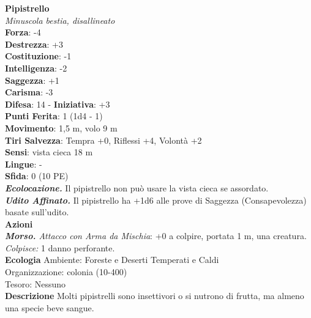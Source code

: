\begin{multicols}{2}
\medskip\textbf{Pipistrello}\\
\emph{Minuscola bestia, disallineato}\\
\textbf{Forza}: -4\\
\textbf{Destrezza}: +3\\
\textbf{Costituzione}: -1\\
\textbf{Intelligenza}: -2\\
\textbf{Saggezza}: +1\\
\textbf{Carisma}: -3\\
\textbf{Difesa}: 14 - \textbf{Iniziativa}: +3\\
\textbf{Punti Ferita}: 1 (1d4 - 1)\\
\textbf{Movimento}: 1,5 m, volo 9 m\\
\textbf{Tiri Salvezza}: Tempra +0, Riflessi +4, Volontà +2 \\
\textbf{Sensi}: vista cieca 18 m \\
\textbf{Lingue}: -\\
\textbf{Sfida}: 0 (10 PE)\smallskip\\
\emph{\textbf{Ecolocazione.}} Il pipistrello non può usare la vista cieca se assordato.\\
\emph{\textbf{Udito Affinato.}} Il pipistrello ha +1d6 alle prove di Saggezza (Consapevolezza) basate sull'udito.\\
\smallskip\textbf{Azioni}\\
\emph{\textbf{Morso.} Attacco con Arma da Mischia}: +0 a colpire, portata 1 m, una creatura.\\
\emph{Colpisce:} 1 danno perforante.\\
\textbf{Ecologia}
Ambiente: Foreste e Deserti Temperati e Caldi\\
Organizzazione: colonia (10-400)\\
Tesoro: Nessuno\\
\textbf{Descrizione}
Molti pipistrelli sono insettivori o si nutrono di frutta, ma almeno una specie beve sangue.\\



\end{multicols}
